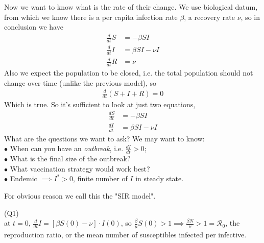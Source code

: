 \documentclass[a4paper]{article}
\begin{document}
Now we want to know what is the rate of their change. We use biological datum, from which we know there is a per capita infection rate $\beta$, a recovery rate $\nu$, so in conclusion we have
\begin{equation*}
\begin{aligned}
\frac{d}{dt} S &= -\beta SI\\
\frac{d}{dt} I &= \beta SI - \nu I\\
\frac{d}{dt} R &= \nu 
\end{aligned}
\end{equation*}
Also we expect the population to be closed, i.e. the total population should not change over time (unlike the previous model), so 
\begin{equation*}
\begin{aligned}
\frac{d}{dt}(S+I+R) = 0
\end{aligned}
\end{equation*}
Which is true. So it's sufficient to look at just two equations,
\begin{equation*}
\begin{aligned}
\frac{dS}{dt} &= -\beta SI\\
\frac{dI}{dt} &= \beta SI - \nu I
\end{aligned}
\end{equation*}
What are the questions we want to ask? We may want to know:\\
$\bullet$ When can you have an \emph{outbreak}, i.e. $\frac{dI}{dt}>0$;\\
$\bullet$ What is the final size of the outbreak?\\
$\bullet$ What vaccination strategy would work best?\\
$\bullet$ Endemic $\implies I^*>0$, finite number of $I$ in steady state.

For obvious reason we call this the "SIR model".

(Q1)\\
at $t=0$, $\frac{d}{dt}I = [\beta S(0) - \nu] \cdot I(0)$, so $\frac{\beta}{\mu}S(0) > 1 \implies \frac{\beta N}{\nu}>1 = \mathcal{R}_0$, the reproduction ratio, or the mean number of susceptibles infected per infective. 
\end{document}
